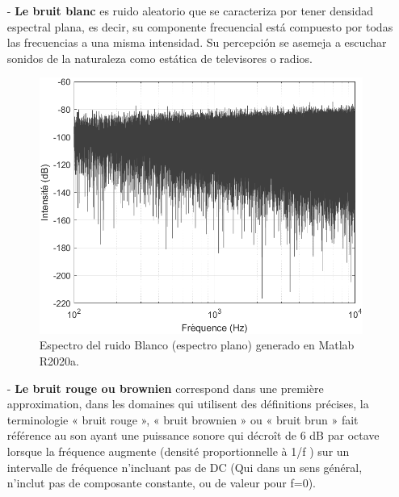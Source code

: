 \documentclass[conference,onecolumn]{IEEEtran}
\begin{document}
\begin{itemize} %

    \item[-] \textbf{Le bruit blanc} es ruido aleatorio que se caracteriza por tener densidad espectral plana, es decir, su componente frecuencial está compuesto por todas las frecuencias a una misma intensidad. Su percepción se asemeja a escuchar sonidos de la naturaleza como estática de televisores o radios.
    
    \begin{figure}[H]
        \centering
        \includegraphics[scale=0.5]{img6.png}
        \caption{Espectro del ruido Blanco (espectro plano) generado en Matlab R2020a.}
    \end{figure}

    \item[-] \textbf{Le bruit rouge ou brownien} correspond dans une première approximation, dans les domaines qui utilisent des définitions précises, la terminologie « bruit rouge », « bruit brownien » ou « bruit brun » fait référence au son ayant une puissance sonore qui décroît de 6 dB par octave lorsque la fréquence augmente (densité proportionnelle à 1/f ) sur un intervalle de fréquence n'incluant pas de DC (Qui dans un sens général, n'inclut pas de composante constante, ou de valeur pour f=0). 


\end{itemize}
\end{document}
